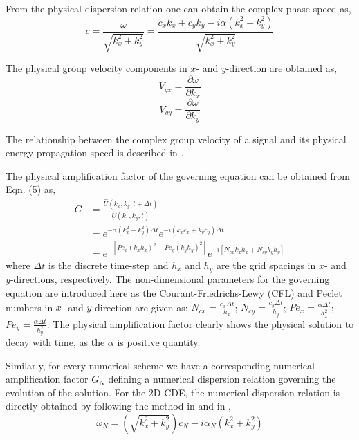 \documentclass[showpacs,preprintnumbers,amsmath,amssymb]{revtex4-1} %
\begin{document}
From the physical dispersion relation one can obtain the complex phase speed as,
\begin{equation}
c=\frac{\omega}{\sqrt{k_x^2+k_y^2}}=\frac{c_xk_x+c_yk_y-i\alpha(k_x^2+k_y^2)}{\sqrt{k_x^2+k_y^2}}
\end{equation}

The physical group velocity components in $x$- and $y$-direction are obtained as,
\begin{equation}
V_{gx}=\frac{\partial \omega}{\partial k_x}%
\end{equation}
\begin{equation}
V_{gy}=\frac{\partial \omega}{\partial k_y}
\end{equation}

The relationship between the complex group velocity of a signal and its physical energy propagation speed is described in \cite{SUMAN_et_al}.

The physical amplification factor of the governing equation can be obtained from Eqn. (5) as,
\begin{equation}
\begin{aligned}
G&=\frac{\hat{U}(k_x,k_y,t+\Delta t)}{\hat{U}(k_x,k_y,t)}\\
&=e^{-\alpha(k_x^2+k_y^2)\Delta t}e^{-i(k_xc_x+k_yc_y)\Delta t}\\
&=e^{-[Pe_x(k_xh_x)^2+Pe_y(k_yh_y)^2]}e^{-i[N_{cx}k_xh_x+N_{cy}k_yh_y]}
\end{aligned}
\end{equation}
where $\Delta t$ is the discrete time-step and $h_x$ and $h_y$ are the grid spacings in $x$- and $y$-directions, respectively. The non-dimensional parameters for the governing equation are introduced here as the Courant-Friedrichs-Lewy (CFL) and Peclet numbers in $x$- and $y$-direction are given as: $N_{cx}=\frac{c_x\Delta t}{h_x}$; $N_{cy}=\frac{c_y\Delta t}{h_y}$; $Pe_{x}=\frac{\alpha \Delta t}{h_x^2}$; $Pe_{y}=\frac{\alpha \Delta t}{h_y^2}$. The physical amplification factor clearly shows the physical solution to decay with time, as the $\alpha$ is positive quantity.

Similarly, for every numerical scheme we have a corresponding numerical amplification factor $G_N$ defining a numerical dispersion relation governing the evolution of the solution. For the 2D CDE, the numerical dispersion relation is directly obtained by following the method in \cite{SUMAN_et_al} and in \cite{pirozzoli2019},
\begin{equation}
\omega_N=\left(\sqrt{k_x^2+k_y^2}\right)c_N-i\alpha_N(k_x^2+k_y^2)
\end{equation}
\end{document}
